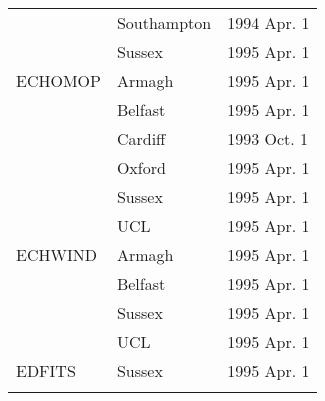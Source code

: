 \begin{table}
\begin{center}
\begin{tabular}{|p{36mm}|p{50mm}|p{30mm}|}
                        & Southampton      & 1994 Apr. 1 \\
                        & Sussex           & 1995 Apr. 1 \\
ECHOMOP                 & Armagh           & 1995 Apr. 1 \\
                        & Belfast          & 1995 Apr. 1 \\
                        & Cardiff          & 1993 Oct. 1 \\
                        & Oxford           & 1995 Apr. 1 \\
                        & Sussex           & 1995 Apr. 1 \\
                        & UCL              & 1995 Apr. 1 \\
ECHWIND                 & Armagh           & 1995 Apr. 1 \\
                        & Belfast          & 1995 Apr. 1 \\
                        & Sussex           & 1995 Apr. 1 \\
                        & UCL              & 1995 Apr. 1 \\
EDFITS                  & Sussex           & 1995 Apr. 1 \\
& & \\ \hline
\end{tabular}
\end{center}
\end{table}

